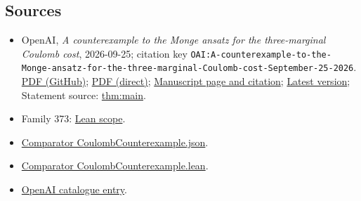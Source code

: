 \documentclass[11pt]{article}
\begin{document}
\subsection{Sources}
\begin{itemize}
\item OpenAI, \emph{A counterexample to the Monge ansatz for the three-marginal Coulomb cost}, 2026-09-25; citation key \texttt{OAI:A-counterexample-to-the-Monge-ansatz-for-the-three-marginal-Coulomb-cost-September-25-2026}. \href{https://github.com/openai/math/blob/adc7f1241b42e322a6451854ab7e4b4c146bf78a/preprints/A-counterexample-to-the-Monge-ansatz-for-the-three-marginal-Coulomb-cost-September-25-2026/paper.pdf}{PDF (GitHub)}; \href{https://github.com/openai/math/raw/adc7f1241b42e322a6451854ab7e4b4c146bf78a/preprints/A-counterexample-to-the-Monge-ansatz-for-the-three-marginal-Coulomb-cost-September-25-2026/paper.pdf}{PDF (direct)}; \href{https://github.com/openai/math/blob/adc7f1241b42e322a6451854ab7e4b4c146bf78a/preprints/A-counterexample-to-the-Monge-ansatz-for-the-three-marginal-Coulomb-cost-September-25-2026/README.md}{Manuscript page and citation}; \href{https://github.com/openai/math/blob/main/preprints/A-counterexample-to-the-Monge-ansatz-for-the-three-marginal-Coulomb-cost-September-25-2026/paper.pdf}{Latest version}; Statement source: \href{https://github.com/openai/math/blob/adc7f1241b42e322a6451854ab7e4b4c146bf78a/preprints/A-counterexample-to-the-Monge-ansatz-for-the-three-marginal-Coulomb-cost-September-25-2026/build/sections/introduction.tex\#L29}{thm:main}.
\item Family 373: \href{https://github.com/openai/math/blob/adc7f1241b42e322a6451854ab7e4b4c146bf78a/lean/docs/373.md}{Lean scope}.
\item \href{https://github.com/openai/math/blob/adc7f1241b42e322a6451854ab7e4b4c146bf78a/lean/ComparatorChallenges/CoulombCounterexample.json}{Comparator CoulombCounterexample.json}.
\item \href{https://github.com/openai/math/blob/adc7f1241b42e322a6451854ab7e4b4c146bf78a/lean/ComparatorChallenges/CoulombCounterexample.lean}{Comparator CoulombCounterexample.lean}.
\item \href{https://github.com/openai/math/blob/adc7f1241b42e322a6451854ab7e4b4c146bf78a/CONTENTS.md}{OpenAI catalogue entry}.
\end{itemize}
\end{document}
